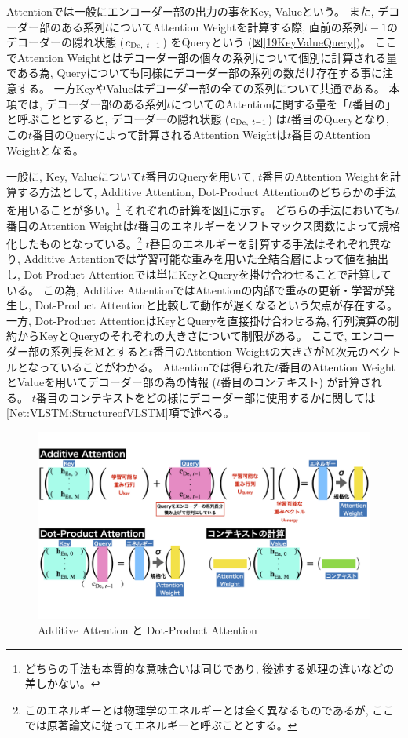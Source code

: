 Attentionでは一般にエンコーダー部の出力の事をKey, Valueという。
また, デコーダー部のある系列$t$についてAttention Weightを計算する際, 直前の系列$t-1$のデコーダーの隠れ状態 (${\mbox{\boldmath{$c$}}}_{{\rm De},\ t-1}$) をQueryという (図\ref{19KeyValueQuery})。
ここでAttention Weightとはデコーダー部の個々の系列について個別に計算される量である為, Queryについても同様にデコーダー部の系列の数だけ存在する事に注意する。
一方KeyやValueはデコーダー部の全ての系列について共通である。
本項では, デコーダー部のある系列$t$についてのAttentionに関する量を「$t$番目の」と呼ぶこととすると, デコーダーの隠れ状態 (${\mbox{\boldmath{$c$}}}_{{\rm De},\ t-1}$) は$t$番目のQueryとなり, この$t$番目のQueryによって計算されるAttention Weightは$t$番目のAttention Weightとなる。

一般に, Key, Valueについて$t$番目のQueryを用いて, $t$番目のAttention Weightを計算する方法として, Additive Attention\cite{BahdanauAttention}, Dot-Product Attention\cite{LuongAttention}のどちらかの手法を用いることが多い。\footnote{どちらの手法も本質的な意味合いは同じであり, 後述する処理の違いなどの差しかない。}
それぞれの計算を図\ref{20Attention}に示す。
どちらの手法においても$t$番目のAttention Weightは$t$番目のエネルギーをソフトマックス関数によって規格化したものとなっている。\footnote{このエネルギーとは物理学のエネルギーとは全く異なるものであるが, ここでは原著論文に従ってエネルギーと呼ぶこととする。}
$t$番目のエネルギーを計算する手法はそれぞれ異なり, Additive Attentionでは学習可能な重みを用いた全結合層によって値を抽出し, Dot-Product Attentionでは単にKeyとQueryを掛け合わせることで計算している。
この為, Additive AttentionではAttentionの内部で重みの更新・学習が発生し, Dot-Product Attentionと比較して動作が遅くなるという欠点が存在する。
一方, Dot-Product AttentionはKeyとQueryを直接掛け合わせる為, 行列演算の制約からKeyとQueryのそれぞれの大きさについて制限がある。
ここで, エンコーダー部の系列長を$\rm M$とすると$t$番目のAttention Weightの大きさが$\rm M$次元のベクトルとなっていることがわかる。
Attentionでは得られた$t$番目のAttention WeightとValueを用いてデコーダー部の為の情報 ($t$番目のコンテキスト) が計算される。
$t$番目のコンテキストをどの様にデコーダー部に使用するかに関しては\ref{Net:VLSTM:StructureofVLSTM}項で述べる。\\

\begin{figure}[htbp]
 \centering
 \includegraphics[trim = 0 100 0 100, width=1.0\textwidth, clip]{Figure/2DeepLearning/20Attention.png}
 \caption{Additive Attention と Dot-Product Attention}
 \label{20Attention}
\end{figure}

